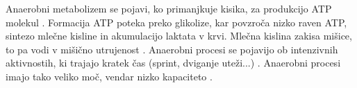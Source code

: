 Anaerobni metabolizem se pojavi, ko primanjkuje kisika, za produkcijo ATP molekul \cite{patel2017aerobic}. Formacija ATP poteka preko glikolize, kar povzroča nizko raven ATP, sintezo mlečne kisline in akumulacijo laktata v krvi. Mlečna kislina zakisa mišice, to pa vodi v mišično utrujenost \cite{sahlin1998energy}. Anaerobni procesi se pojavijo ob intenzivnih aktivnostih, ki trajajo kratek čas (sprint, dviganje uteži...) \cite{patel2017aerobic}. Anaerobni procesi imajo tako veliko moč, vendar nizko kapaciteto \cite{sahlin1998energy}.